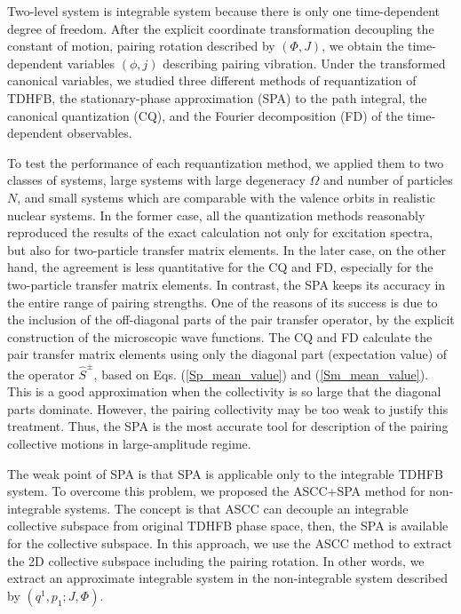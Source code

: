 \documentclass[11pt]{book} %
\begin{document}
Two-level system is integrable system because there is only one time-dependent degree of freedom. After the explicit coordinate transformation decoupling the constant of motion, pairing rotation described by $(\Phi, J)$, we obtain the time-dependent variables $(\phi, j)$ describing pairing vibration. Under the transformed canonical variables, we studied three different methods of requantization of TDHFB, the stationary-phase approximation (SPA) to the path integral, the canonical quantization (CQ), and the Fourier decomposition (FD) of the time-dependent observables. 

To test the performance of each requantization method, we applied them to two classes of systems, large systems with large degeneracy $\Omega$ and number of particles $N$, and small systems which are comparable with the valence orbits in realistic nuclear systems. 
In the former case, all the quantization methods reasonably reproduced the results of the
exact calculation not only for excitation spectra, but also for two-particle transfer matrix elements.
In the later case, on the other hand, the agreement is
less quantitative for the CQ and FD, especially for the two-particle
transfer matrix elements.
In contrast, the SPA keeps its accuracy in the entire range of
pairing strengths.
One of the reasons of its success is due to the inclusion of the off-diagonal 
parts of the pair transfer operator,
by the explicit construction of the microscopic wave functions.
The CQ and FD calculate the pair transfer matrix elements using only
the diagonal part (expectation value) of the operator $\hat{S}^\pm$,
based on Eqs. (\ref{Sp_mean_value}) and (\ref{Sm_mean_value}).
This is a good approximation when the collectivity is so large that the
diagonal parts dominate.
However, the pairing collectivity may be too weak to justify this
treatment.
Thus, the SPA is the most accurate tool for description of the pairing collective motions in large-amplitude regime.

The weak point of SPA is that SPA is applicable only to the
integrable TDHFB system. To overcome this problem, we proposed the ASCC+SPA method for non-integrable systems. The concept is that ASCC can decouple an integrable collective subspace from original TDHFB phase space, then, the SPA is available for the collective subspace.
In this approach, we use the ASCC method to extract the 2D
collective subspace including the pairing rotation.
In other words, we extract an approximate integrable system 
in the non-integrable system described by $(q^1,p_1;J,\Phi)$.
\end{document}
